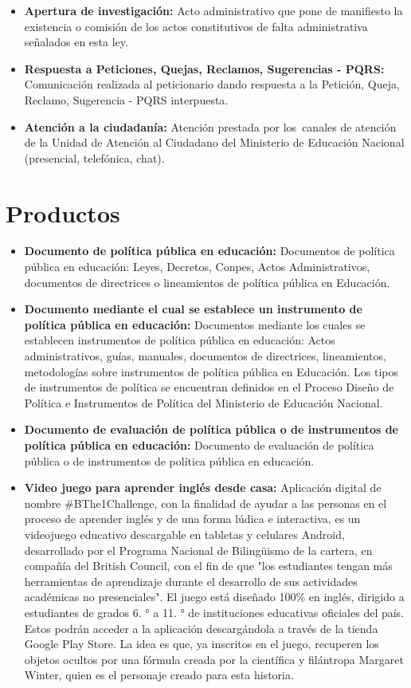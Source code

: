 \begin{itemize}
	\item \textbf{Apertura de investigación:} Acto administrativo que pone de manifiesto la existencia o comisión de los actos constitutivos de falta administrativa señalados en esta ley.
	\item \textbf{Respuesta a Peticiones, Quejas, Reclamos, Sugerencias - PQRS:} Comunicación realizada al peticionario dando respuesta a la Petición, Queja, Reclamo, Sugerencia - PQRS interpuesta.
	\item \textbf{Atención a la ciudadanía:} Atención prestada por los canales de atención de la Unidad de Atención al Ciudadano del Ministerio de Educación Nacional (presencial, telefónica, chat).
\end{itemize}

\section{Productos}
\begin{itemize}
	\item \textbf{Documento de política pública en educación:} Documentos de política pública en educación: Leyes, Decretos, Conpes, Actos Administrativos, documentos de directrices o lineamientos de política pública en Educación.
	\item \textbf{Documento mediante el cual se establece un instrumento de política pública en educación:} Documentos mediante los cuales se establecen instrumentos de política pública en educación: Actos administrativos, guías, manuales, documentos de directrices, lineamientos, metodologías sobre instrumentos de política pública en Educación. Los tipos de instrumentos de política se encuentran definidos en el Proceso Diseño de Política e Instrumentos de Política del Ministerio de Educación Nacional.
	\item \textbf{Documento de evaluación de política pública o de instrumentos de política pública en educación:} Documento de evaluación de política pública o de instrumentos de política pública en educación. 
	\item \textbf{Video juego para aprender inglés desde casa:} Aplicación digital de nombre \#BThe1Challenge, con la finalidad de ayudar a las personas en el proceso de aprender inglés y de una forma lúdica e interactiva, es un videojuego educativo descargable en tabletas y celulares Android, desarrollado por el Programa Nacional de Bilingüismo de la cartera, en compañía del British Council, con el fin de que "los estudiantes tengan más herramientas de aprendizaje durante el desarrollo de sus actividades académicas no presenciales". El juego está diseñado 100\% en inglés, dirigido a estudiantes de grados 6. ° a 11. ° de instituciones educativas oficiales del país. Estos podrán acceder a la aplicación descargándola a través de la tienda Google Play Store. La idea es que, ya inscritos en el juego, recuperen los objetos ocultos por una fórmula creada por la científica y filántropa Margaret Winter, quien es el personaje creado para esta historia.
\end{itemize}

